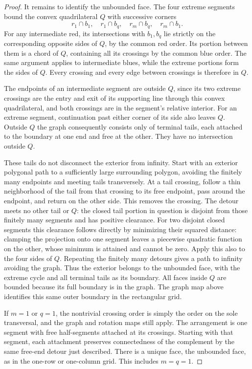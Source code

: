 \documentclass[11pt]{article}
\begin{document}
\begin{proof}
It remains to identify the unbounded face. The four extreme segments
bound the convex quadrilateral \(Q\) with successive corners
\[
 r_1\cap b_1,\quad r_1\cap b_q,\quad
 r_m\cap b_q,\quad r_m\cap b_1.
\]
For any intermediate red, its intersections with \(b_1,b_q\) lie
strictly on the corresponding opposite sides of \(Q\), by the common
red order. Its portion between them is a chord of \(Q\), containing
all its crossings by the common blue order. The same argument applies
to intermediate blues, while the extreme portions form the sides of
\(Q\). Every crossing and every edge between crossings is therefore
in \(Q\).

The endpoints of an intermediate segment are outside \(Q\), since
its two extreme crossings are the entry and exit of its supporting
line through this convex quadrilateral, and both crossings are in
the segment's relative interior. For an extreme segment, continuation
past either corner of its side also leaves \(Q\). Outside \(Q\) the
graph consequently consists only of terminal tails, each attached to
the boundary at one end and free at the other. They have no
intersection outside \(Q\).

These tails do not disconnect the exterior from infinity. Start with
an exterior polygonal path to a sufficiently large surrounding polygon,
avoiding the finitely many endpoints and meeting tails transversely.
At a tail crossing, follow a thin neighborhood of the tail from that
crossing to its free endpoint, pass around the endpoint, and return
on the other side. This removes the crossing. The detour meets no
other tail or \(Q\): the closed tail portion in question is disjoint
from those finitely many segments and has positive clearance.
For two disjoint closed segments this clearance follows directly by
minimizing their squared distance: clamping the projection onto one
segment leaves a piecewise quadratic function on the other, whose
minimum is attained and cannot be zero. Apply this also to the four
sides of \(Q\). Repeating the finitely many detours gives a path to
infinity avoiding the graph.
Thus the exterior belongs to the unbounded face, with the extreme
cycle and all terminal tails as its boundary. All faces inside \(Q\)
are bounded because its full boundary is in the graph. The graph map
above identifies this same outer boundary in the rectangular grid.

If \(m=1\) or \(q=1\), the nontrivial crossing order is simply the
order on the sole transversal, and the graph and rotation maps still
apply. The arrangement is one segment with free half-segments attached
at its crossings. Starting with that segment, each attachment preserves
connectedness of the complement by the same free-end detour just
described. There is a unique face, the unbounded face, as in the
one-row or one-column grid. This includes \(m=q=1\).
\end{proof}
\end{document}
